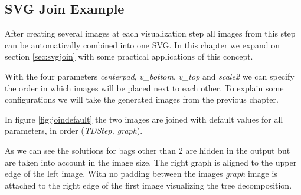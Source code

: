 \documentclass[a4paper, 12pt, bibliography=totoc]{scrartcl}
\begin{document}
\subsection{SVG Join Example}

After creating several images at each visualization step all images from this step can be automatically combined into one SVG. In this chapter we expand on section \ref{sec:svgjoin} with some practical applications of this concept.

With the four parameters \textit{centerpad}, \textit{v\_bottom}, \textit{v\_top} and \textit{scale2} we can specify the order in which images will be placed next to each other. To explain some configurations we will take the generated images from the previous chapter.

In figure \ref{fig:joindefault} the two images are joined with default values for all parameters, in order (\textit{TDStep, graph}). 

As we can see the solutions for bags other than 2 are hidden in the output but are taken into account in the image size. The right graph is aligned to the upper edge of the left image. With no padding between the images \textit{graph} image is attached to the right edge of the first image visualizing the {tree decomposition}.
\end{document}
